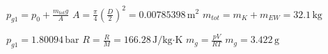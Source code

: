 \( p_{g1} = p_0 + \frac{m_{tot} g}{A} \)  
\( A = \frac{\pi}{4} \left(\frac{D}{2}\right)^2 = 0.00785398 \, \text{m}^2 \)  
\( m_{tot} = m_K + m_{EW} = 32.1 \, \text{kg} \)  

\( p_{g1} = 1.80094 \, \text{bar} \)  
\( R = \frac{R}{M} = 166.28 \, \text{J/kg·K} \)  
\( m_g = \frac{p V}{R T} \)  
\( m_g = 3.422 \, \text{g} \)
